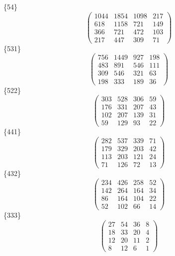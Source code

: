 \documentclass[12pt,reqno]{amsart}
\begin{document}
\{54\}                             $$ \begin{pmatrix} 
                     1044 & 1854 & 1098 & 217 \\[6pt]
                      618 & 1158 & 721 & 149 \\[6pt]
                       366 & 721 & 472 & 103 \\[6pt]
                         217 & 447 & 309 & 71
                              \end{pmatrix} $$ 
\{531\}                             $$ \begin{pmatrix} 
                      756 & 1449 & 927 & 198 \\[6pt]
                       483 & 891 & 546 & 111 \\[6pt]
                       309 & 546 & 321 & 63 \\[6pt]
                         198 & 333 & 189 & 36
                              \end{pmatrix} $$ 
\{522\}                             $$ \begin{pmatrix} 
                       303 & 528 & 306 & 59 \\[6pt]
                       176 & 331 & 207 & 43 \\[6pt]
                       102 & 207 & 139 & 31 \\[6pt]
                          59 & 129 & 93 & 22
                              \end{pmatrix} $$ 
\{441\}                             $$ \begin{pmatrix} 
                       282 & 537 & 339 & 71 \\[6pt]
                       179 & 329 & 203 & 42 \\[6pt]
                       113 & 203 & 121 & 24 \\[6pt]
                          71 & 126 & 72 & 13
                              \end{pmatrix} $$ 
\{432\}                             $$ \begin{pmatrix} 
                       234 & 426 & 258 & 52 \\[6pt]
                       142 & 264 & 164 & 34 \\[6pt]
                        86 & 164 & 104 & 22 \\[6pt]
                          52 & 102 & 66 & 14
                              \end{pmatrix} $$ 
\{333\}                             $$ \begin{pmatrix} 
                         27 & 54 & 36 & 8 \\[6pt]
                         18 & 33 & 20 & 4 \\[6pt]
                         12 & 20 & 11 & 2 \\[6pt]
                            8 & 12 & 6 & 1
                              \end{pmatrix} $$ 
\end{document}
